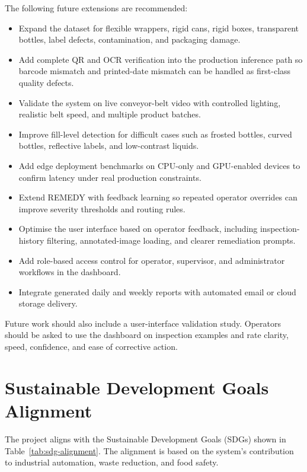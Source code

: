 \documentclass[12pt,a4paper]{report}
\begin{document}
The following future extensions are recommended:
\begin{itemize}
  \item Expand the dataset for flexible wrappers, rigid cans, rigid boxes, transparent bottles, label defects, contamination, and packaging damage.
  \item Add complete QR and OCR verification into the production inference path so barcode mismatch and printed-date mismatch can be handled as first-class quality defects.
  \item Validate the system on live conveyor-belt video with controlled lighting, realistic belt speed, and multiple product batches.
  \item Improve fill-level detection for difficult cases such as frosted bottles, curved bottles, reflective labels, and low-contrast liquids.
  \item Add edge deployment benchmarks on CPU-only and GPU-enabled devices to confirm latency under real production constraints.
  \item Extend REMEDY with feedback learning so repeated operator overrides can improve severity thresholds and routing rules.
  \item Optimise the user interface based on operator feedback, including inspection-history filtering, annotated-image loading, and clearer remediation prompts.
  \item Add role-based access control for operator, supervisor, and administrator workflows in the dashboard.
  \item Integrate generated daily and weekly reports with automated email or cloud storage delivery.
\end{itemize}

Future work should also include a user-interface validation study. Operators should be asked to use the dashboard on inspection examples and rate clarity, speed, confidence, and ease of corrective action.

\section{Sustainable Development Goals Alignment}
\label{sec:sdg-alignment}

The project aligns with the Sustainable Development Goals (SDGs) shown in Table~\ref{tab:sdg-alignment}. The alignment is based on the system's contribution to industrial automation, waste reduction, and food safety.
\end{document}
